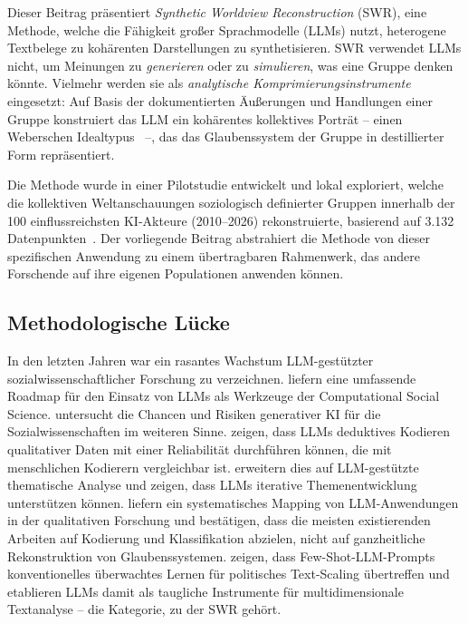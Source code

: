 \documentclass[11pt,a4paper]{article}
\begin{document}
Dieser Beitrag präsentiert \emph{Synthetic Worldview Reconstruction} (SWR), eine Methode, welche die Fähigkeit großer Sprachmodelle (LLMs) nutzt, heterogene Textbelege zu kohärenten Darstellungen zu synthetisieren. SWR verwendet LLMs nicht, um Meinungen zu \emph{generieren} oder zu \emph{simulieren}, was eine Gruppe denken könnte. Vielmehr werden sie als \emph{analytische Komprimierungsinstrumente} eingesetzt: Auf Basis der dokumentierten Äußerungen und Handlungen einer Gruppe konstruiert das LLM ein kohärentes kollektives Porträt -- einen Weberschen Idealtypus~\citep{Weber1904} --, das das Glaubenssystem der Gruppe in destillierter Form repräsentiert.

Die Methode wurde in einer Pilotstudie entwickelt und lokal exploriert, welche die kollektiven Weltanschauungen soziologisch definierter Gruppen innerhalb der 100 einflussreichsten KI-Akteure (2010--2026) rekonstruierte, basierend auf 3.132 Datenpunkten~\citep{Geiger2026PaperA}. Der vorliegende Beitrag abstrahiert die Methode von dieser spezifischen Anwendung zu einem übertragbaren Rahmenwerk, das andere Forschende auf ihre eigenen Populationen anwenden können.


\subsection{Methodologische Lücke}
\label{sec:intro:gap}

In den letzten Jahren war ein rasantes Wachstum LLM-gestützter sozialwissenschaftlicher Forschung zu verzeichnen. \citet{Ziems2024} liefern eine umfassende Roadmap für den Einsatz von LLMs als Werkzeuge der Computational Social Science. \citet{Bail2024} untersucht die Chancen und Risiken generativer KI für die Sozialwissenschaften im weiteren Sinne. \citet{Tai2024} zeigen, dass LLMs deduktives Kodieren qualitativer Daten mit einer Reliabilität durchführen können, die mit menschlichen Kodierern vergleichbar ist. \citet{Wang2025} erweitern dies auf LLM-gestützte thematische Analyse und zeigen, dass LLMs iterative Themenentwicklung unterstützen können. \citet{Barros2024} liefern ein systematisches Mapping von LLM-Anwendungen in der qualitativen Forschung und bestätigen, dass die meisten existierenden Arbeiten auf Kodierung und Klassifikation abzielen, nicht auf ganzheitliche Rekonstruktion von Glaubenssystemen. \citet{Ornstein2025} zeigen, dass Few-Shot-LLM-Prompts konventionelles überwachtes Lernen für politisches Text-Scaling übertreffen und etablieren LLMs damit als taugliche Instrumente für multidimensionale Textanalyse -- die Kategorie, zu der SWR gehört.
\end{document}
